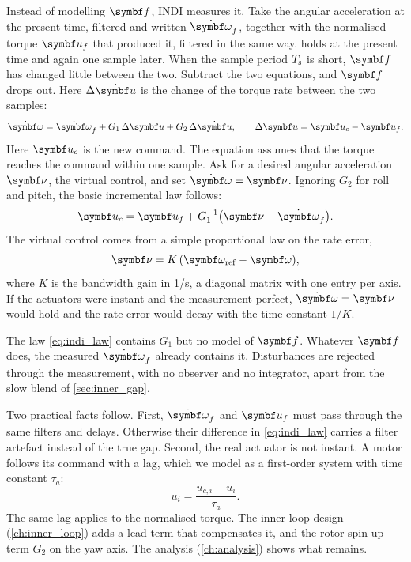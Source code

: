Instead of modelling $\vect{f}$, INDI measures it.
Take the angular acceleration at the present time, filtered and written $\dot{\vect\omega}_f$, together with the normalised torque $\vect{u}_f$ that produced it, filtered in the same way.
 holds at the present time and again one sample later.
When the sample period $T_{\mathrm{s}}$ is short, $\vect{f}$ has changed little between the two.
Subtract the two equations, and $\vect{f}$ drops out.
Here $\Delta\dot{\vect{u}}$ is the change of the torque rate between the two samples:
\begin{equation}\label{eq:increment}
  \dot{\vect\omega} = \dot{\vect\omega}_f + G_1\,\Delta\vect{u} + G_2\,\Delta\dot{\vect{u}} ,
  \qquad \Delta\vect{u} = \vect{u}_c - \vect{u}_f .
\end{equation}
Here $\vect{u}_c$ is the new command.
The equation assumes that the torque reaches the command within one sample.
Ask for a desired angular acceleration $\vect\nu$, the virtual control, and set $\dot{\vect\omega}=\vect\nu$.
Ignoring $G_2$ for roll and pitch, the basic incremental law follows:
\begin{equation}\label{eq:indi_law}
  \vect{u}_c = \vect{u}_f + G_1^{-1}\bigl(\vect\nu - \dot{\vect\omega}_f\bigr) .
\end{equation}
The virtual control comes from a simple proportional law on the rate error,
\begin{equation}\label{eq:nu}
  \vect\nu = K\,(\vect\omega_{\mathrm{ref}} - \vect\omega) ,
\end{equation}
where $K$ is the bandwidth gain in 1/s, a diagonal matrix with one entry per axis.
If the actuators were instant and the measurement perfect, $\dot{\vect\omega}=\vect\nu$ would hold and the rate error would decay with the time constant $1/K$.

\begin{keyresult}
The law \cref{eq:indi_law} contains $G_1$ but no model of $\vect{f}$.
Whatever $\vect{f}$ does, the measured $\dot{\vect\omega}_f$ already contains it.
Disturbances are rejected through the measurement, with no observer and no integrator, apart from the slow blend of \cref{sec:inner_gap}.
\end{keyresult}

Two practical facts follow.
First, $\dot{\vect\omega}_f$ and $\vect{u}_f$ must pass through the same filters and delays.
Otherwise their difference in \cref{eq:indi_law} carries a filter artefact instead of the true gap.
Second, the real actuator is not instant.
A motor follows its command with a lag, which we model as a first-order system with time constant $\tau_a$:
\begin{equation}\label{eq:actuator}
  \dot{u}_i = \frac{u_{c,i} - u_i}{\tau_a} .
\end{equation}
The same lag applies to the normalised torque.
The inner-loop design (\cref{ch:inner_loop}) adds a lead term that compensates it, and the rotor spin-up term $G_2$ on the yaw axis.
The analysis (\cref{ch:analysis}) shows what remains.

